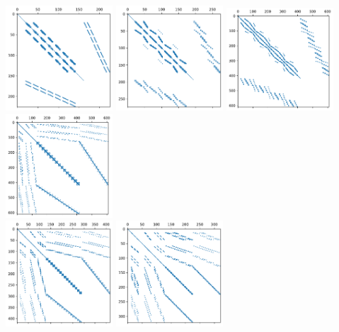 \documentclass[a4paper]{article}
\begin{document}
\begin{center}
\includegraphics[width=4cm]{../results/spy/A_bef_topo0.pdf}
\includegraphics[width=4cm]{../results/spy/A_bef_topo1.pdf}
\includegraphics[width=4cm]{../results/spy/A_bef_topo2.pdf}
\includegraphics[width=4cm]{../results/spy/A_bef_topo3.pdf}\\
\includegraphics[width=4cm]{../results/spy/A_bef_topo4.pdf}
\includegraphics[width=4cm]{../results/spy/A_bef_topo5.pdf}

\end{center}
\end{document}
